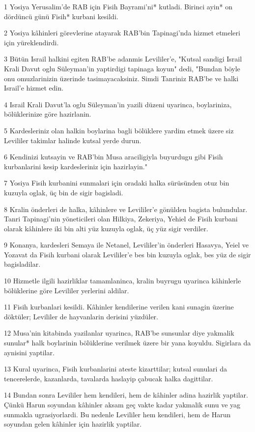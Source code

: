 \par 1 Yosiya Yerusalim'de RAB için Fisih Bayrami'ni* kutladi. Birinci ayin* on dördüncü günü Fisih* kurbani kesildi.
\par 2 Yosiya kâhinleri görevlerine atayarak RAB'bin Tapinagi'nda hizmet etmeleri için yüreklendirdi.
\par 3 Bütün Israil halkini egiten RAB'be adanmis Levililer'e, "Kutsal sandigi Israil Krali Davut oglu Süleyman'in yaptirdigi tapinaga koyun" dedi, "Bundan böyle onu omuzlarinizin üzerinde tasimayacaksiniz. Simdi Tanriniz RAB'be ve halki Israil'e hizmet edin.
\par 4 Israil Krali Davut'la oglu Süleyman'in yazili düzeni uyarinca, boylariniza, bölüklerinize göre hazirlanin.
\par 5 Kardesleriniz olan halkin boylarina bagli bölüklere yardim etmek üzere siz Levililer takimlar halinde kutsal yerde durun.
\par 6 Kendinizi kutsayin ve RAB'bin Musa araciligiyla buyurdugu gibi Fisih kurbanlarini kesip kardesleriniz için hazirlayin."
\par 7 Yosiya Fisih kurbanini sunmalari için oradaki halka sürüsünden otuz bin kuzuyla oglak, üç bin de sigir bagisladi.
\par 8 Kralin önderleri de halka, kâhinlere ve Levililer'e gönülden bagista bulundular. Tanri Tapinagi'nin yöneticileri olan Hilkiya, Zekeriya, Yehiel de Fisih kurbani olarak kâhinlere iki bin alti yüz kuzuyla oglak, üç yüz sigir verdiler.
\par 9 Konanya, kardesleri Semaya ile Netanel, Levililer'in önderleri Hasavya, Yeiel ve Yozavat da Fisih kurbani olarak Levililer'e bes bin kuzuyla oglak, bes yüz de sigir bagisladilar.
\par 10 Hizmetle ilgili hazirliklar tamamlaninca, kralin buyrugu uyarinca kâhinlerle bölüklerine göre Levililer yerlerini aldilar.
\par 11 Fisih kurbanlari kesildi. Kâhinler kendilerine verilen kani sunagin üzerine döktüler; Levililer de hayvanlarin derisini yüzdüler.
\par 12 Musa'nin kitabinda yazilanlar uyarinca, RAB'be sunsunlar diye yakmalik sunular* halk boylarinin bölüklerine verilmek üzere bir yana koyuldu. Sigirlara da aynisini yaptilar.
\par 13 Kural uyarinca, Fisih kurbanlarini ateste kizarttilar; kutsal sunulari da tencerelerde, kazanlarda, tavalarda haslayip çabucak halka dagittilar.
\par 14 Bundan sonra Levililer hem kendileri, hem de kâhinler adina hazirlik yaptilar. Çünkü Harun soyundan kâhinler aksam geç vakte kadar yakmalik sunu ve yag sunmakla ugrasiyorlardi. Bu nedenle Levililer hem kendileri, hem de Harun soyundan gelen kâhinler için hazirlik yaptilar.
